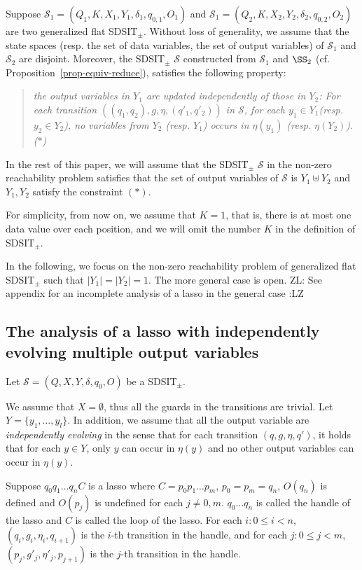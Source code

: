 \documentclass[runningheads,a4paper]{llncs}
\def\Ss{{\mathcal{S} }}
\newcommand{\zhilin}[1]{\color{cyan} {ZL: #1 :LZ} \color{black}}
\newcommand{\SDSIT}{SDSIT}
\begin{document}
Suppose $\Ss_1=(Q_1, K, X_1, Y_1, \delta_1, q_{0,1}, O_1)$ and $\Ss_1=(Q_2, K, X_2, Y_2, \delta_2, q_{0,2}, O_2)$ are two generalized flat \SDSIT$_{\pm}$. Without loss of generality, we assume that the state spaces (resp. the set of data variables, the set of output variables) of $\Ss_1$ and $\Ss_2$ are disjoint. Moreover, the \SDSIT$_{\pm}$ $\Ss$ constructed from $\Ss_1$ and $\SS_2$ (cf. Proposition~\ref{prop-equiv-reduce}), satisfies the following property: 
\begin{quote}
\it the output variables in $Y_1$ are updated independently of those in $Y_2$: For each transition $((q_1,q_2),g,\eta,(q'_1,q'_2))$ in $\Ss$, for each $y_1 \in Y_1$(resp. $y_2 \in Y_2$), no variables from $Y_2$ (resp. $Y_1$) occurs in $\eta(y_1)$ (resp. $\eta(Y_2)$). \hfill ($\ast$)
\end{quote}

In the rest of this paper, we will assume that the \SDSIT$_{\pm}$ $\Ss$ in the non-zero reachability problem satisfies that the set of output variables of $\Ss$ is $Y_1 \uplus Y_2$ and $Y_1,Y_2$ satisfy the constraint $(\ast)$.

For simplicity, from now on, we assume that $K=1$, that is, there is at most one data value over each position, and we will omit the number $K$ in the definition of \SDSIT$_{\pm}$.

In the following, we focus on the non-zero reachability problem of generalized flat \SDSIT$_{\pm}$ such that $|Y_1| = |Y_2|=1$. The more general case is open. \zhilin{See appendix for an incomplete analysis of a lasso in the general case}




\subsection{The analysis of a lasso with independently evolving multiple output variables}

Let $\Ss=(Q, X, Y, \delta, q_0, O)$ be a \SDSIT$_{\pm}$. 

We assume that $X=\emptyset$, thus all the guards in the transitions are trivial. Let $Y=\{y_1,\dots,y_l\}$. In addition, we assume that all the output variable are \emph{independently evolving} in the sense that for each transition $(q,g, \eta, q')$, it holds that for each $y \in Y$, only $y$ can occur in $\eta(y)$ and no other output variables can occur in $\eta(y)$. 

Suppose $q_0 q_1 \dots q_n C$ is a lasso where $C=p_0 p_1 \dots p_m$, $p_0 = p_m=q_n$, $O(q_n)$ is defined and $O(p_j)$ is undefined for each $j \neq 0,m$. $q_0 \dots q_n$ is called the handle of the lasso and $C$ is called the loop of the lasso. For each $i: 0 \le i < n$, $(q_i, g_i, \eta_i, q_{i+1})$ is the $i$-th transition in the handle, and for each $j: 0 \le j < m$, $(p_j, g'_j, \eta'_j, p_{j+1})$ is the $j$-th transition in the handle. 
\end{document}
